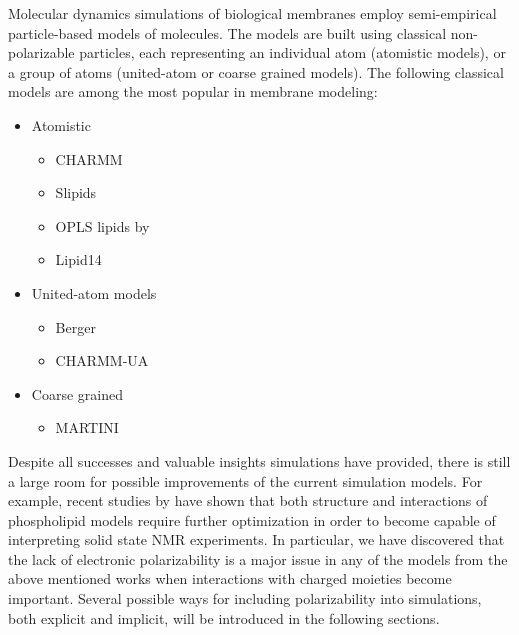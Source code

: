 
Molecular dynamics simulations of biological membranes employ semi-empirical particle-based models of molecules. 
The models are built using classical non-polarizable particles, 
each representing an individual atom (atomistic models), 
or a group of atoms (united-atom or coarse grained models). 
The following classical models are among the most popular in membrane modeling:
\begin{itemize}
 \item Atomistic
 \begin{itemize}
   \item CHARMM \citep{klauda10}
   \item Slipids \citep{jambeck12, jambeck12b}
   \item OPLS lipids by \citet{maciejewski14}
   \item Lipid14 \citep{dickson14}
  \end{itemize}

 \item United-atom models
  \begin{itemize}
   \item Berger \citep{Berger97}
   \item CHARMM-UA \citep{lee14}
  \end{itemize}
 \item Coarse grained
 \begin{itemize}
   \item MARTINI \citep{marrink07}
  \end{itemize}
\end{itemize}

Despite all successes and valuable insights simulations have provided, 
there is still a large room for possible improvements of the current simulation models. 
For example, recent studies by \citet{botan15, catte16} have shown 
that both structure and interactions of phospholipid models require further optimization 
in order to become capable of interpreting solid state NMR experiments. 
In particular, we have discovered that 
the lack of electronic polarizability is a major issue in any of the models 
from the above mentioned works %
when interactions with charged moieties become important. 
Several possible ways for including polarizability into simulations, both explicit and implicit, 
will be introduced in the following sections. 





